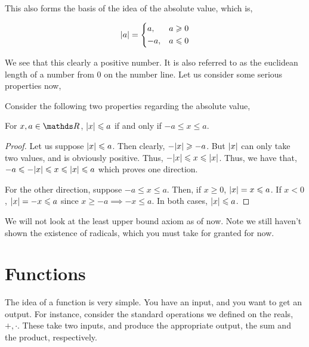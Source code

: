 
This also forms the basis of the idea of the absolute value, which is, 

\begin{equation}
    \abs{a} = 
    \begin{dcases}
        a, & a \geqslant 0 \\
        -a, & a \leqslant 0
    \end{dcases}
\end{equation}

We see that this clearly a positive number. It is also referred to as the euclidean length of 
a number from \(0\) on the number line. Let us consider some serious properties now, 

Consider the following two properties regarding the absolute value,

\begin{plaintheo}
    For \(x, a \in \RR\), \(\abs{x} \leqslant a\) if and only if \( -a \le x \le a\).
\end{plaintheo}

\begin{proof}
    Let us suppose \(\abs{x} \leqslant a\). Then clearly, \(-\abs{x} \geqslant -a\). But 
    \(\abs{x}\) can only take two values, and is obviously positive. Thus, \(-\abs{x} \leqslant 
    x \leqslant \abs{x}\). Thus, we have that, \(-a \leqslant -\abs{x} \leqslant x \leqslant \abs{x} \leqslant a\) which 
    proves one direction.
    
    For the other direction, suppose \(-a \le x \le a\). Then, if \(x \ge 0\), 
    \(\abs{x} = x \leqslant a\). If \(x < 0\), \(\abs{x} = -x \leqslant a\) since \(x \ge -a \implies -x \le a\).
    In both cases, \(\abs{x} \leqslant a\). 
\end{proof}

We will not look at the least upper bound axiom as of now. Note we still haven't 
shown the existence of radicals, which you must take for granted for now.

\section{Functions}

The idea of a function is very simple. You have an input, and you want to get 
an output. For instance, consider the standard operations we defined on the reals,
\(+, \cdot\). These take two inputs, and produce the appropriate output, the sum 
and the product, respectively.

